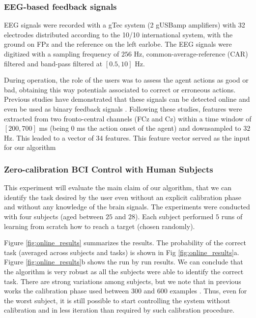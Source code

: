\documentclass[conference]{IEEEtran}
\begin{document}
\subsubsection{EEG-based feedback signals}
%
EEG signals were recorded with a gTec system (2 gUSBamp amplifiers) with 32 electrodes distributed according to the 10/10 international system, with the ground on FPz and the reference on the left earlobe. The EEG signals were digitized with a sampling frequency of $256$ Hz, common-average-reference (CAR) filtered and band-pass filtered at $[0.5, 10]$ Hz. 

During operation, the role of the users was to assess the agent actions as good or bad, obtaining this way potentials associated to correct or erroneous actions. Previous studies have demonstrated that these signals can be detected online \cite{FerrezErrores} and even be used as binary feedback signals \cite{chavarriaga2010learning}. Following these studies, features were extracted from two fronto-central channels (FCz and Cz) within a time window of $[200,700]$ ms (being 0 ms the action onset of the agent) and downsampled to $32$ Hz. This leaded to a vector of $34$ features. This feature vector served as the input for our algorithm
%
\subsubsection{Zero-calibration BCI Control with Human Subjects}
%
This experiment will evaluate the main claim of our algorithm, that we can identify the task desired by the user even without an explicit calibration phase and without any knowledge of the brain signals. The experiments were conducted with four subjects (aged between $25$ and $28$). Each subject performed $5$ runs of learning from scratch how to reach a target (chosen randomly).

Figure \ref{fig:online_results} summarizes the results. The probability of the correct task (averaged across subjects and tasks) is shown in Fig \ref{fig:online_results}a. Figure \ref{fig:online_results}b shows the run by run results. We can conclude that the algorithm is very robust as all the subjects were able to identify the correct task. There are strong variations among subjects, but we note that in previous works the calibration phase used between  300 and 600 examples \cite{chavarriaga2010learning, iturrate2010Katana}. Thus, even for the worst subject, it is still possible to start controlling the system without calibration and in less iteration than required by such calibration procedure. 
\end{document}
